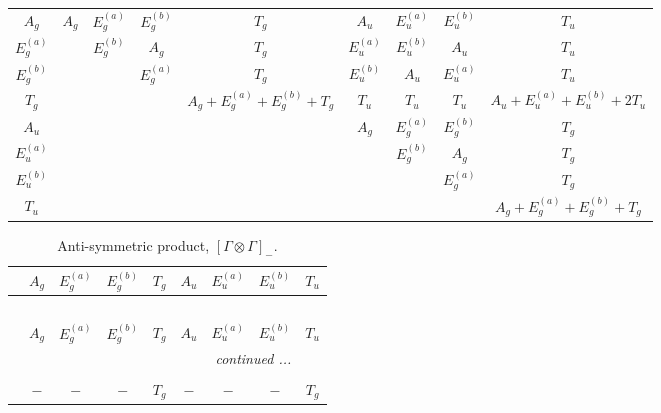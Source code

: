 \documentclass[fleqn,10pt,landscape]{article}
\begin{document}
\begin{itemize}
\begin{center}
\begin{longtable}{c|cccccccc}
$ A_{g} $ & $ A_{g} $ & $ E_{g}^{(a)} $ & $ E_{g}^{(b)} $ & $ T_{g} $ & $ A_{u} $ & $ E_{u}^{(a)} $ & $ E_{u}^{(b)} $ & $ T_{u} $ \\
$ E_{g}^{(a)} $ & $  $ & $ E_{g}^{(b)} $ & $ A_{g} $ & $ T_{g} $ & $ E_{u}^{(a)} $ & $ E_{u}^{(b)} $ & $ A_{u} $ & $ T_{u} $ \\
$ E_{g}^{(b)} $ & $  $ & $  $ & $ E_{g}^{(a)} $ & $ T_{g} $ & $ E_{u}^{(b)} $ & $ A_{u} $ & $ E_{u}^{(a)} $ & $ T_{u} $ \\
$ T_{g} $ & $  $ & $  $ & $  $ & $ A_{g} + E_{g}^{(a)} + E_{g}^{(b)} + T_{g} $ & $ T_{u} $ & $ T_{u} $ & $ T_{u} $ & $ A_{u} + E_{u}^{(a)} + E_{u}^{(b)} + 2 T_{u} $ \\
$ A_{u} $ & $  $ & $  $ & $  $ & $  $ & $ A_{g} $ & $ E_{g}^{(a)} $ & $ E_{g}^{(b)} $ & $ T_{g} $ \\
$ E_{u}^{(a)} $ & $  $ & $  $ & $  $ & $  $ & $  $ & $ E_{g}^{(b)} $ & $ A_{g} $ & $ T_{g} $ \\
$ E_{u}^{(b)} $ & $  $ & $  $ & $  $ & $  $ & $  $ & $  $ & $ E_{g}^{(a)} $ & $ T_{g} $ \\
$ T_{u} $ & $  $ & $  $ & $  $ & $  $ & $  $ & $  $ & $  $ & $ A_{g} + E_{g}^{(a)} + E_{g}^{(b)} + T_{g} $ \\
\end{longtable}
\end{center}
\begin{center}
\renewcommand{\arraystretch}{1.0}
\begin{longtable}{ccccccccc}
\caption{Anti-symmetric product, $[\Gamma\otimes\Gamma]_-$.}
 \\
 \hline \hline
 & $ A_{g} $ & $ E_{g}^{(a)} $ & $ E_{g}^{(b)} $ & $ T_{g} $ & $ A_{u} $ & $ E_{u}^{(a)} $ & $ E_{u}^{(b)} $ & $ T_{u} $ \\ \hline \endfirsthead

\multicolumn{8}{l}{\tablename\ \thetable{}} \\
 \hline \hline
 & $ A_{g} $ & $ E_{g}^{(a)} $ & $ E_{g}^{(b)} $ & $ T_{g} $ & $ A_{u} $ & $ E_{u}^{(a)} $ & $ E_{u}^{(b)} $ & $ T_{u} $ \\ \hline \endhead

 \hline \hline
\multicolumn{8}{r}{\footnotesize\it continued ...} \\ \endfoot

 \hline \hline
\multicolumn{8}{r}{} \\ \endlastfoot

$  $ & $ - $ & $ - $ & $ - $ & $ T_{g} $ & $ - $ & $ - $ & $ - $ & $ T_{g} $ \\
\end{longtable}
\end{center}


\end{itemize}
\end{document}
